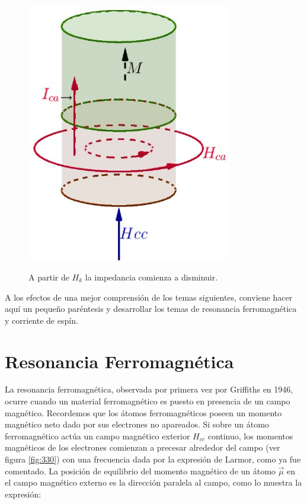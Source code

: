 \begin{figure}[H]
  \begin{minipage}[b]{0.47\textwidth}
     \includegraphics[width=0.8\textwidth]{./Figures/fig329}
	\label{fig:329}
  \end{minipage}
  \hfill
  \begin{minipage}[b]{0.47\textwidth}
A partir de $H_{k}$ la impedancia comienza a disminuir.
  \vspace{3cm}
  \end{minipage}
\end{figure}

A los efectos de una mejor comprensión de los temas siguientes, conviene hacer aquí un pequeño paréntesis y desarrollar los temas de resonancia ferromagnética y corriente de espín.

\section{Resonancia Ferromagnética}

La resonancia ferromagnética, observada por primera vez por Griffiths en 1946, ocurre cuando un material ferromagnético es puesto en presencia de un campo magnético. Recordemos que los átomos ferromagnéticos poseen un momento magnético neto dado por sus electrones no apareados. Si sobre un átomo ferromagnético actúa un campo magnético exterior $H_{cc}$ continuo, los momentos magnéticos de los electrones comienzan a precesar alrededor del campo (ver figura \ref{fig:330}) con una frecuencia dada por la expresión de Larmor, como ya fue comentado. La posición de equilibrio del momento magnético de un átomo $\overrightarrow{\mu}$ en el campo magnético externo es la dirección paralela al campo, como lo muestra la expresión:

